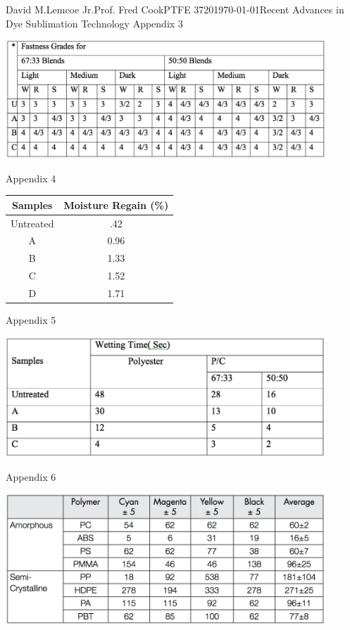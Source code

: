 \documentclass[12pt,letterpaper]{article}
\begin{document}
\begin{mla}{David M.}{Lemcoe Jr.}{Prof. Fred Cook}{PTFE 3720}{\today}{Recent Advances in Dye Sublimation Technology}
Appendix 3

\begin{center}
\includegraphics[width=0.9\textwidth]{3}
\end{center}

Appendix 4

\begin{center}
\begin{tabular}{ | c | c |}
\hline
Samples & Moisture Regain (\%) \\ \hline
Untreated & .42 \\ \hline
A & 0.96 \\ \hline
B & 1.33 \\ \hline
C & 1.52 \\ \hline
D & 1.71 \\ \hline
\end{tabular}
\end{center}

Appendix 5

\begin{center}
\includegraphics[width=0.9\textwidth]{5}
\end{center}

Appendix 6

\begin{center}
\includegraphics[width=0.9\textwidth]{6}
\end{center}


\end{mla}
\end{document}
